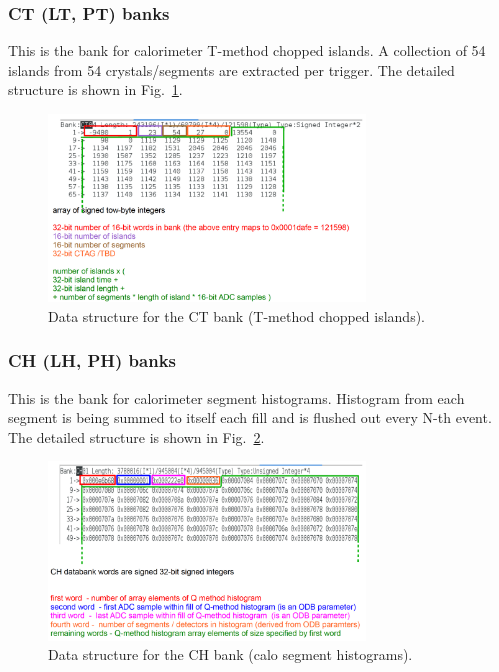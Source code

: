 \subsubsection*{CT (LT, PT) banks}

This is the bank for calorimeter T-method chopped islands. A collection of 54 islands from 54 crystals/segments are extracted per trigger. The detailed structure is shown in Fig.~\ref{fig:CTBankFormat}.

\begin{figure}[htbp]
\centering
\includegraphics[width=0.75\textwidth]{pics/CTBankFormat.pdf} 
\caption{Data structure for the CT bank (T-method chopped islands).}\label{fig:CTBankFormat}
\end{figure}

\subsubsection*{CH (LH, PH) banks}

This is the bank for calorimeter segment histograms. Histogram from each segment is being summed to itself each fill and is flushed out every N-th event. The detailed structure is shown in Fig.~\ref{fig:CHBankFormat}.

\begin{figure}[htbp]
\centering
\includegraphics[width=0.75\textwidth]{pics/CHBankFormat.pdf} 
\caption{Data structure for the CH bank (calo segment histograms).}\label{fig:CHBankFormat}
\end{figure}

